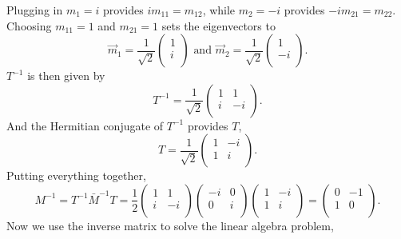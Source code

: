 \documentclass[12pt]{article}
\begin{document}
Plugging in $m_1=i$ provides $im_{11} = m_{12}$, while $m_2=-i$ provides $-im_{21} = m_{22}$. Choosing $m_{11} = 1$ and $m_{21} = 1$ sets the eigenvectors to 
\begin{equation}
\vec{m}_1 = 
\frac{1}{\sqrt{2}}
\begin{pmatrix}
1 \\ i \\
\end{pmatrix}
\text{ and }
\vec{m}_2 = 
\frac{1}{\sqrt{2}}
\begin{pmatrix}
1 \\ -i \\
\end{pmatrix}.
\end{equation}
$T^{-1}$ is then given by 
\begin{equation}
T^{-1} =
\frac{1}{\sqrt{2}}
\begin{pmatrix}
1 & 1 \\
i & -i \\
\end{pmatrix}.
\end{equation}
And the Hermitian conjugate of $T^{-1}$ provides $T$,
\begin{equation}
T =
\frac{1}{\sqrt{2}}
\begin{pmatrix}
1 & -i \\
1 & i \\
\end{pmatrix}.
\end{equation}
Putting everything together,
\begin{equation}
M^{-1} = T^{-1}\bar{M}^{-1}T =
\frac{1}{2}
\begin{pmatrix}
1 & 1 \\
i & -i \\
\end{pmatrix}
\begin{pmatrix}
-i & 0 \\
0 & i \\
\end{pmatrix}
\begin{pmatrix}
1 & -i \\
1 & i \\
\end{pmatrix}
=
\begin{pmatrix}
0 & -1 \\
1 & 0 \\
\end{pmatrix}.
\end{equation}
Now we use the inverse matrix to solve the linear algebra problem,
\end{document}
